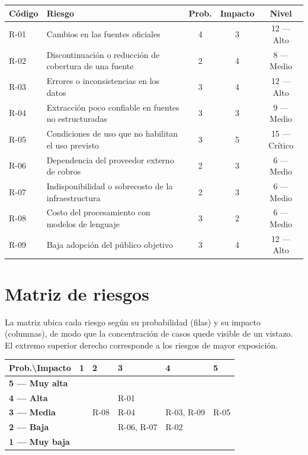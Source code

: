 \documentclass[11pt,a4paper]{article}
\begin{document}
\begin{tabularx}{\textwidth}{@{}l X c c c@{}}
\toprule
\textbf{C\'odigo} & \textbf{Riesgo} & \textbf{Prob.} & \textbf{Impacto} & \textbf{Nivel} \\
\midrule
R-01 & Cambios en las fuentes oficiales                       & 4 & 3 & 12 --- Alto \\
R-02 & Discontinuaci\'on o reducci\'on de cobertura de una fuente & 2 & 4 & 8 --- Medio \\
R-03 & Errores o inconsistencias en los datos                 & 3 & 4 & 12 --- Alto \\
R-04 & Extracci\'on poco confiable en fuentes no estructuradas & 3 & 3 & 9 --- Medio \\
R-05 & Condiciones de uso que no habilitan el uso previsto    & 3 & 5 & 15 --- Cr\'itico \\
R-06 & Dependencia del proveedor externo de cobros           & 2 & 3 & 6 --- Medio \\
R-07 & Indisponibilidad o sobrecosto de la infraestructura    & 2 & 3 & 6 --- Medio \\
R-08 & Costo del procesamiento con modelos de lenguaje        & 3 & 2 & 6 --- Medio \\
R-09 & Baja adopci\'on del p\'ublico objetivo                  & 3 & 4 & 12 --- Alto \\
\bottomrule
\end{tabularx}

\section{Matriz de riesgos}

La matriz ubica cada riesgo seg\'un su probabilidad (filas) y su impacto
(columnas), de modo que la concentraci\'on de casos quede visible de un vistazo.
El extremo superior derecho corresponde a los riesgos de mayor exposici\'on.

\begin{tabularx}{\textwidth}{@{}l *{5}{>{\centering\arraybackslash}X}@{}}
\toprule
\textbf{Prob.\textbackslash Impacto} & \textbf{1} & \textbf{2} & \textbf{3} & \textbf{4} & \textbf{5} \\
\midrule
\textbf{5 --- Muy alta} &  &  &  &  &  \\
\addlinespace
\textbf{4 --- Alta}     &  &  & R-01 &  &  \\
\addlinespace
\textbf{3 --- Media}    &  & R-08 & R-04 & R-03, R-09 & R-05 \\
\addlinespace
\textbf{2 --- Baja}     &  &  & R-06, R-07 & R-02 &  \\
\addlinespace
\textbf{1 --- Muy baja} &  &  &  &  &  \\
\bottomrule
\end{tabularx}
\end{document}
